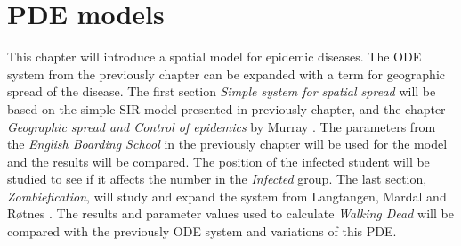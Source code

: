 \documentclass[%
twoside,                 %
final,                   %
chapterprefix=true,      %
open=right               %
10pt]{book}
\begin{document}
\chapter{PDE models}
This chapter will introduce a spatial model for epidemic diseases. The ODE system from the previously chapter can be expanded with a term for geographic spread of the disease. The first section \emph{Simple system for spatial spread} will be based on the simple SIR model presented in previously chapter, and the chapter \emph{Geographic spread and Control of epidemics} by Murray \cite{murray2003mathematical}. The parameters from the \emph{English Boarding School} in the previously chapter will be used for the model and the results will be compared. The position of the infected student will be studied to see if it affects the number in the \emph{Infected} group. The last section, \emph{Zombiefication}, will study and expand the system from Langtangen, Mardal and Røtnes \cite{zombie-math}. The results and parameter values used to calculate \emph{Walking Dead} will be compared with the previously ODE system and variations of this PDE. 
\end{document}
